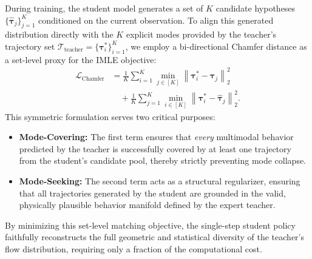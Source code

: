 During training, the student model generates a set of $K$ candidate hypotheses $\{\hat{\boldsymbol{\tau}}_j\}_{j=1}^K$ conditioned on the current observation. To align this generated distribution directly with the $K$ explicit modes provided by the teacher's trajectory set $\mathcal{T}_{\text{teacher}} = \{\boldsymbol{\tau}_i^*\}_{i=1}^K$, we employ a bi-directional Chamfer distance as a set-level proxy for the IMLE objective:
\begin{align}
    \mathcal{L}_{\text{Chamfer}} &= \frac{1}{K} \sum_{i=1}^K \min_{j \in [K]} \left\| \boldsymbol{\tau}_i^* - \hat{\boldsymbol{\tau}}_j \right\|^2_2 \nonumber \\
    &\quad + \frac{1}{K} \sum_{j=1}^K \min_{i \in [K]} \left\| \boldsymbol{\tau}_i^* - \hat{\boldsymbol{\tau}}_j \right\|^2_2 .
\end{align}
This symmetric formulation serves two critical purposes:
\begin{itemize}
    \item \textbf{Mode-Covering:} The first term ensures that \textit{every} multimodal behavior predicted by the teacher is successfully covered by at least one trajectory from the student's candidate pool, thereby strictly preventing mode collapse.
    \item \textbf{Mode-Seeking:} The second term acts as a structural regularizer, ensuring that all trajectories generated by the student are grounded in the valid, physically plausible behavior manifold defined by the expert teacher.
\end{itemize}
By minimizing this set-level matching objective, the single-step student policy faithfully reconstructs the full geometric and statistical diversity of the teacher's flow distribution, requiring only a fraction of the computational cost.